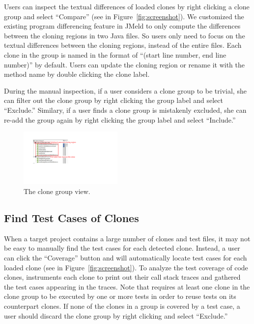 Users can inspect the textual differences of loaded clones by right clicking a clone group and select ``Compare'' (see  in Figure~\ref{fig:screenshot}). We customized the existing program differencing feature in JMeld to only compute the differences between the cloning regions in two Java files. So users only need to focus on the textual differences between the cloning regions, instead of the entire files. Each clone in the group is named in the format of ``(start line number, end line number)'' by default. Users can update the cloning region or rename it with the method name by double clicking the clone label.

During the manual inspection, if a user considers a clone group to be trivial, she can filter out the clone group by right clicking the group label and select ``Exclude.'' Similary, if a user finds a clone group is mistakenly excluded, she can re-add the group again by right clicking the group label and select ``Include.''

\begin{figure}[!t]
\centering
\includegraphics[width=0.45\textwidth]{clone-group-view.pdf}
\caption{The clone group view.}
\label{fig:output}
\end{figure}

\subsection{Find Test Cases of Clones}

When a target project contains a large number of clones and test files, it may not be easy to manually find the test cases for each detected clone. Instead, a user can click the ``Coverage'' button and {\grafter} will automatically locate test cases for each loaded clone (see  in Figure~\ref{fig:screenshot}). To analyze the test coverage of code clones, {\grafter} instruments each clone to print out their call stack traces and gathered the test cases appearing in the traces. Note that {\grafter} requires at least one clone in the clone group to be executed by one or more tests in order to reuse tests on its counterpart clones. If none of the clones in a group is covered by a test case, a user should discard the clone group by right clicking and select ``Exclude.''

